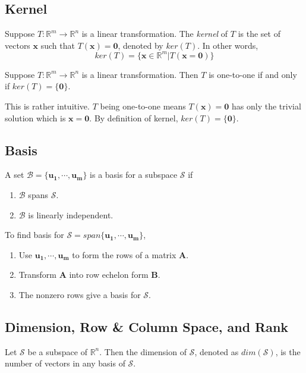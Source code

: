 \subsection{Kernel}
\begin{definition}[Kernel]
Suppose $T:\mathbb{R}^m\rightarrow\mathbb{R}^n$ is a linear transformation. The \emph{kernel} of $T$ is the set of vectors $\bm{x}$ such that $T(\bm{x})=\bm{0}$, denoted by $ker(T)$. In other words,
\begin{equation}
ker(T) = \{\bm{x}\in\mathbb{R}^m | T(\bm{x}=\bm{0})\}
\end{equation}
\end{definition}

\begin{theorem}
Suppose $T:\mathbb{R}^m\rightarrow\mathbb{R}^n$ is a linear transformation. Then $T$ is one-to-one if and only if $ker(T)=\{\bm{0}\}$.
\end{theorem}
This is rather intuitive. $T$ being one-to-one means $T(\bm{x})=\bm{0}$ has only the trivial solution which is $\bm{x}=\bm{0}$. By definition of kernel, $ker(T)=\{\bm{0}\}$.

\subsection{Basis}
\begin{definition}[Basis]
A set $\mathcal{B}=\{\bm{u_1},\cdots,\bm{u_m}\}$ is a basis for a subspace $\mathcal{S}$ if
\begin{enumerate}[label=\alph*)]
    \item $\mathcal{B}$ spans $\mathcal{S}$.
    \item $\mathcal{B}$ is linearly independent.
\end{enumerate}
\end{definition}

\noindent To find basis for $\mathcal{S}=span\{\bm{u_1},\cdots,\bm{u_m}\}$,
\begin{enumerate}
    \item Use $\bm{u_1},\cdots,\bm{u_m}$ to form the rows of a matrix $\bm{A}$.
    \item Transform $\bm{A}$ into row echelon form $\bm{B}$.
    \item The nonzero rows give a basis for $\mathcal{S}$.
\end{enumerate}

\subsection{Dimension, Row \& Column Space, and Rank}
\begin{definition}[Dimension]
Let $\mathcal{S}$ be a subspace of $\mathbb{R}^n$. Then the dimension of $\mathcal{S}$, denoted as $dim(\mathcal{S})$, is the number of vectors in any basis of $\mathcal{S}$.
\end{definition}

